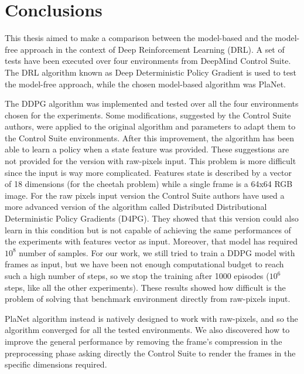 
\chapter{Conclusions} %

\label{Chapter7} %

This thesis aimed to make a comparison between the model-based and the model-free approach in the context of Deep Reinforcement Learning (DRL). A set of tests have been executed over four environments from DeepMind Control Suite. The DRL algorithm known as Deep Deterministic Policy Gradient is used to test the model-free approach, while the chosen model-based algorithm was PlaNet.

The DDPG algorithm was implemented and tested over all the four environments chosen for the experiments. Some modifications, suggested by the Control Suite authors, were applied to the original algorithm and  parameters to adapt them to the Control Suite environments. After this improvement, the algorithm has been able to learn a policy when a state feature was provided.
These suggestions are not provided for the version with raw-pixels input. This problem is more difficult since the input is way more complicated. Features state is described by a vector of 18 dimensions (for the cheetah problem) while a single frame is a 64x64 RGB image. For the raw pixels input version the Control Suite authors have used a more advanced version of the algorithm called Distributed Distributional Deterministic Policy Gradients (D4PG). They showed that this version could also learn in this condition but is not capable of achieving the same performances of the experiments with features vector as input.
Moreover, that model has required $10^8$ number of samples. For our work, we still tried to train a DDPG model with frames as input, but we have been not enough computational budget to reach such a high number of steps, so we stop the training after 1000 episodes ($10^6$ steps, like all the other experiments). These results showed how difficult is the problem of solving that benchmark environment directly from raw-pixels input. 

PlaNet algorithm instead is natively designed to work with raw-pixels, and so  the algorithm converged for all the tested environments. We also discovered how to improve the general performance by removing the frame's compression in the preprocessing phase asking directly the Control Suite to render the frames in the specific dimensions required.

